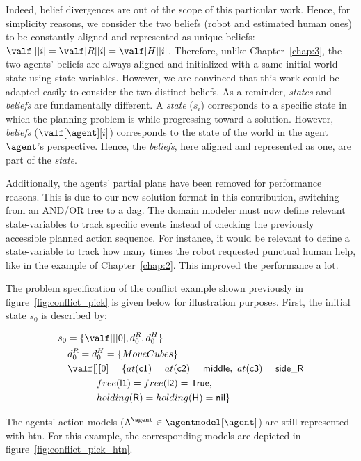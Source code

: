 Indeed, belief divergences are out of the scope of this particular work. Hence, for simplicity reasons, we consider the two beliefs (robot and estimated human ones) to be constantly aligned and represented as unique beliefs: $\valf[][i] = \valf[R][i] = \valf[H][i]$. Therefore, unlike Chapter~\ref{chap:3}, the two agents' beliefs are always aligned and initialized with a same initial world state using state variables. However, we are convinced that this work could be adapted easily to consider the two distinct beliefs. As a reminder, \textit{states} and \textit{beliefs} are fundamentally different. A \textit{state} ($s_i$) corresponds to a specific state in which the planning problem is while progressing toward a solution. However, \textit{beliefs} ($\valf[\agent][i]$) corresponds to the state of the world in the agent $\agent$'s perspective. Hence, the \textit{beliefs}, here aligned and represented as one, are part of the \textit{state}.

Additionally, the agents' partial plans have been removed for performance reasons. This is due to our new solution format in this contribution, switching from an AND/OR tree to a \acrfull{dag}. The domain modeler must now define relevant state-variables to track specific events instead of checking the previously accessible planned action sequence. For instance, it would be relevant to define a state-variable to track how many times the robot requested punctual human help, like in the example of Chapter~\ref{chap:2}. This improved the performance a lot.

The problem specification of the conflict example shown previously in figure~\ref{fig:conflict_pick} is given below for illustration purposes. First, the initial state $s_0$ is described by:

{\small
\begin{align*}
&s_0 = \{\valf[][0], d^R_0, d^H_0 \} \\
&\quad d^R_0 = d^H_0 = \{ MoveCubes \} \\
&\quad \valf[][0] = \{at(\textsf{c1}) = at(\textsf{c2}) = \textsf{middle},~at(\textsf{c3}) = \textsf{side\_R} \\
&\quad \quad \quad \quad free(\textsf{l1}) = free(\textsf{l2}) = \textsf{True}, \\
&\quad \quad \quad \quad holding(\textsf{R}) = holding(\textsf{H}) = \textsf{nil} \} \\
\end{align*}
}

The agents' action models ($\Lambda^\agent \in \agentmodel[\agent]$) are still represented with \acrshort{htn}. For this example, the corresponding models are depicted in figure~\ref{fig:conflict_pick_htn}. 

